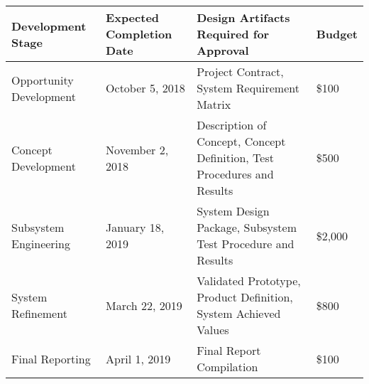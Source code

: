 

\begin{table}[h!]

\begin{tabular}{|p{4cm}|p{3.5cm}|p{5.4cm}|p{1.5cm}|}
 \hline	
\rowcolor[HTML]{C0C0C0}	
{\color[HTML]{000000} \textbf{Development Stage}} & {\color[HTML]{000000} \textbf{Expected Completion Date}} & {\color[HTML]{000000} \textbf{Design Artifacts Required for Approval}} & {\color[HTML]{000000} \textbf{Budget}}\\ \hline	
Opportunity Development & October 5, 2018 & Project Contract, System Requirement Matrix & \$100 \\ \hline	
Concept Development & November 2, 2018 & Description of Concept, Concept Definition, Test Procedures and Results & \$500 \\ \hline	
Subsystem Engineering & January 18, 2019 & System Design Package, Subsystem Test Procedure and Results & \$2,000\\ \hline	
System Refinement & March 22, 2019 & Validated Prototype, Product Definition, System Achieved Values & \$800\\ \hline	
Final Reporting & April 1, 2019 & Final Report Compilation & \$100 \\ \hline	

  \hline  
\end{tabular}

\end{table}
